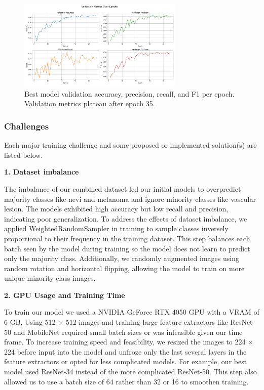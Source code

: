 \documentclass{article} %
\begin{document}
\begin{figure}[h]
\begin{center}
\includegraphics[width=0.7\textwidth]{Figs/validation_metrics.png}
\end{center}
\caption{Best model validation accuracy, precision, recall, and F1 per epoch. Validation metrics plateau after epoch 35.}
\end{figure}

\subsubsection{Challenges}

Each major training challenge and some proposed or implemented solution(s) are listed below.

\textbf{1. Dataset imbalance}

The imbalance of our combined dataset led our initial models to overpredict majority classes like nevi and melanoma and ignore minority classes like vascular lesion. The models exhibited high accuracy but low recall and precision, indicating poor generalization. To address the effects of dataset imbalance, we applied WeightedRandomSampler in training to sample classes inversely proportional to their frequency in the training dataset. This step balances each batch seen by the model during training so the model does not learn to predict only the majority class. Additionally, we randomly augmented images using random rotation and horizontal flipping, allowing the model to train on more unique minority class images.

\textbf{2. GPU Usage and Training Time}

To train our model we used a NVIDIA GeForce RTX 4050 GPU with a VRAM of 6 GB. Using 512 × 512 images and training large feature extractors like ResNet-50 and MobileNet required small batch sizes or was infeasible given our time frame. To increase training speed and feasibility, we resized the images to 224 × 224 before input into the model and unfroze only the last several layers in the feature extractors or opted for less complicated models. For example, our best model used ResNet-34 instead of the more complicated ResNet-50. This step also allowed us to use a batch size of 64 rather than 32 or 16 to smoothen training.
\end{document}
